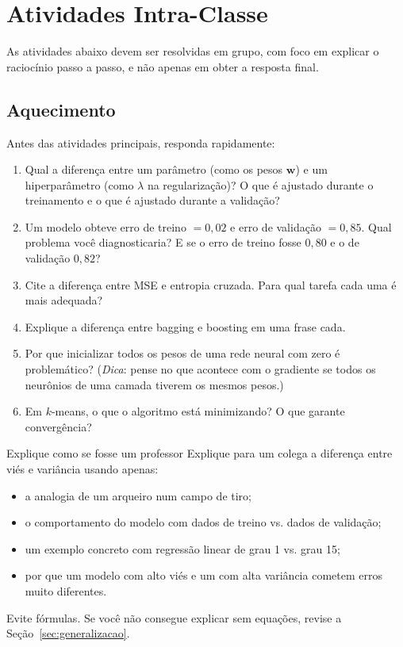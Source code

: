 \documentclass[12pt,a4paper]{article}
\begin{document}
\section{Atividades Intra-Classe}

As atividades abaixo devem ser resolvidas em grupo, com foco em explicar o raciocínio passo a passo, e não apenas em obter a resposta final.

\subsection{Aquecimento}

Antes das atividades principais, responda rapidamente:

\begin{enumerate}[label=(\alph*)]
    \item Qual a diferença entre um parâmetro (como os pesos $\mathbf{w}$) e um hiperparâmetro (como $\lambda$ na regularização)? O que é ajustado durante o treinamento e o que é ajustado durante a validação?
    \item Um modelo obteve erro de treino $= 0{,}02$ e erro de validação $= 0{,}85$. Qual problema você diagnosticaria? E se o erro de treino fosse $0{,}80$ e o de validação $0{,}82$?
    \item Cite a diferença entre MSE e entropia cruzada. Para qual tarefa cada uma é mais adequada?
    \item Explique a diferença entre bagging e boosting em uma frase cada.
    \item Por que inicializar todos os pesos de uma rede neural com zero é problemático? (\textit{Dica}: pense no que acontece com o gradiente se todos os neurônios de uma camada tiverem os mesmos pesos.)
    \item Em $k$-means, o que o algoritmo está minimizando? O que garante convergência?
\end{enumerate}

\begin{checkpointbox}{Explique como se fosse um professor}
Explique para um colega a diferença entre viés e variância usando apenas:
\begin{itemize}[nosep]
    \item a analogia de um arqueiro num campo de tiro;
    \item o comportamento do modelo com dados de treino vs. dados de validação;
    \item um exemplo concreto com regressão linear de grau 1 vs. grau 15;
    \item por que um modelo com alto viés e um com alta variância cometem erros muito diferentes.
\end{itemize}
Evite fórmulas. Se você não consegue explicar sem equações, revise a Seção~\ref{sec:generalizacao}.
\end{checkpointbox}
\end{document}
